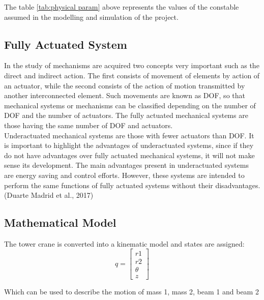 \documentclass{UoNMCHA}
\numberwithin{equation}{section}
\begin{document}
	The table \ref{tab:physical param} above represents the values of the constable assumed in the modelling and simulation of the project.
	
	
	\subsection{Fully Actuated System}
	
	In the study of mechanisms are acquired two concepts very important such as the direct and indirect action. The first consists of movement of elements by action of an actuator, while the second consists of the action of motion transmitted by another interconnected element. Such movements are known as DOF, so that mechanical systems or mechanisms can be classified depending on the number of DOF and the number of actuators. The fully actuated mechanical systems are those having the same number of DOF and actuators. \\
	
	Underactuated mechanical systems are those with fewer actuators than DOF. It is important to highlight the advantages of underactuated systems, since if they do not have advantages over fully actuated mechanical systems, it will not make sense its development. The main advantages present in underactuated systems are energy saving and control efforts. However, these systems are intended to perform the same functions of fully actuated systems without their disadvantages. (Duarte Madrid et al., 2017)
	
	
	\subsection{Mathematical Model}
	
	The tower crane is converted into a kinematic model and states are assigned: 
	\begin{equation}
	q = 
	\begin{bmatrix}
	r1 \\ r2 \\ \theta \\ z
	\end{bmatrix}
	\end{equation}
	
	Which can be used to describe the motion of mass 1, mass 2, beam 1 and beam 2
	
\end{document}
